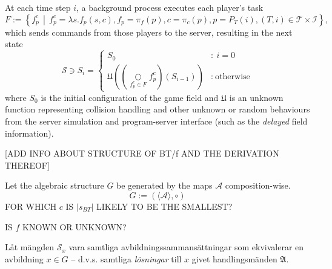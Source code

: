 \documentclass[10pt,a4paper]{article}
\begin{document}
At each time step \(i\), a background process executes each player's task
\[
		F := \left\{ f_p^c \,\middle|\, f_p^c = \lambda s.f_p(s, c), f_p = \pi_f(p), c = \pi_c(p), p = P_T(i), (T,i)\in\mathcal{T} \times \mathcal{I}  \right\}
\text{,}
\]
which sends commands from those players to the server, resulting in the next state 
\[
		\mathcal{S} \ni S_{i} = \left\{
			\begin{array}{cl}
				S_0 & : \ i = 0 \\
					\mathfrak{U} \left( \left(\underset{f_p^c\in F}\bigcirc f_p^c\right)(S_{i-1}) \right) & : \ \text{otherwise}
			\end{array}
		\right.
\] %
where \(S_0\) is the initial configuration of the game field and \(\mathfrak{U}\) is an unknown function representing collision handling and other unknown or random behaviours from the server simulation and program-server interface (such as the \textit{delayed} field information). %

[ADD INFO ABOUT STRUCTURE OF BT/f AND THE DERIVATION THEREOF]

Let the algebraic structure \(G\) be generated by the maps \(\mathcal{A}\) composition-wise.
\begin{equation}
		G:=\left(\langle\mathcal{A}\rangle,\circ\right)
\end{equation}
FOR WHICH \(c\) IS \(| s_{BT} |\) LIKELY TO BE THE SMALLEST?

IS \(f\) KNOWN OR UNKNOWN?

Låt mängden \(\mathscr{S}_x\) vara samtliga avbildningssammansättningar som ekvivalerar en avbildning \(x\in G\) -- d.v.s. samtliga \textit{lösningar} till \(x\) givet handlingsmänden \(\mathfrak{A}\).
\end{document}
